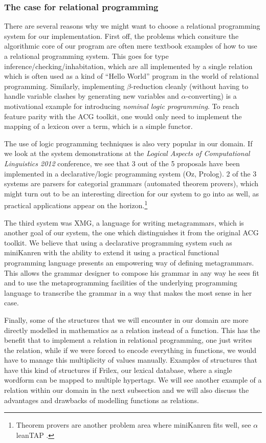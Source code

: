 \subsubsection{The case for relational programming}

There are several reasons why we might want to choose a relational
programming system for our implementation. First off, the problems which
consiture the algorithmic core of our program are often mere textbook
examples of how to use a relational programming system. This goes for
type inference/checking/inhabitation, which are all implemented by a
single relation which is often used as a kind of ``Hello World'' program
in the world of relational programming. Similarly, implementing
$\beta$-reduction cleanly (without having to handle variable clashes by
generating new variables and $\alpha$-converting) is a motivational
example for introducing \emph{nominal logic programming}. To reach
feature parity with the ACG toolkit, one would only need to implement
the mapping of a lexicon over a term, which is a simple functor.

The use of logic programming techniques is also very popular in our
domain. If we look at the system demonstrations at the \emph{Logical
  Aspects of Computational Linguistics 2012} conference, we see that 3
out of the 5 proposals have been implemented in a declarative/logic
programming system (Oz, Prolog). 2 of the 3 systems are parsers for
categorial grammars (automated theorem provers), which might turn out to
be an interesting direction for our system to go into as well, as
practical applications appear on the horizon.\footnote{Theorem provers
  are another problem area where miniKanren fits well, see
  $\alpha$leanTAP \cite{near2008alpha}.}

The third system was XMG, a language for writing metagrammars, which is
another goal of our system, the one which distinguishes it from the
original ACG toolkit. We believe that using a declarative programming
system such as miniKanren with the ability to extend it using a
practical functional programming language presents an empowering way of
defining metagrammars. This allows the grammar designer to compose his
grammar in any way he sees fit and to use the metaprogramming facilities
of the underlying programming language to transcribe the grammar in a
way that makes the most sense in her case.

Finally, some of the structures that we will encounter in our domain are
more directly modelled in mathematics as a relation instead of a
function. This has the benefit that to implement a relation in
relational programming, one just writes the relation, while if we were
forced to encode everything in functions, we would have to manage this
multiplicity of values manually. Examples of structures that have this
kind of structures if Frilex, our lexical database, where a single
wordform can be mapped to multiple hypertags. We will see another
example of a relation within our domain in the next subsection and we
will also discuss the advantages and drawbacks of modelling functions as
relations.

